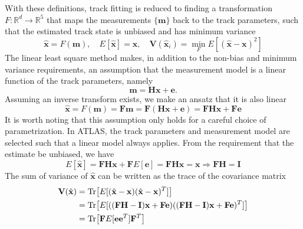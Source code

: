 With these definitions, track fitting is reduced to finding a transformation $F: \mathbb{R}^d \to \mathbb{R}^5$ that maps the measurements $\{\mathbf{m}\}$ back to the track parameters, such that the estimated track state is unbiased and has minimum variance
\begin{equation}
    \label{11.4}
    \hat{\mathbf{x}} = F(\mathbf{m}), \quad E[\hat{\mathbf{x}}] = \mathbf{x}, \quad \mathbf{V}(\hat{\mathbf{x}}_i) = \min_F E[(\hat{\mathbf{x}} - \mathbf{x}) ^2]
\end{equation}
The linear least square method makes, in addition to the non-bias and minimum variance requirements, an assumption that the measurement model is a linear function of the track parameters, namely 
\begin{equation}
    \label{11.4.1}
    \mathbf{m} = \mathbf{Hx} + \mathbf{e}.
\end{equation}
Assuming an inverse transform exists, we make an ansatz that it is also linear
\begin{equation}
    \label{11.5}
    \hat{\mathbf{x}} = F(\mathbf{m}) = \mathbf{F}\mathbf{m} = \mathbf{F}(\mathbf{Hx} + \mathbf{e}) = \mathbf{FHx} + \mathbf{Fe}
\end{equation}
It is worth noting that this assumption only holds for a careful choice of parametrization. In ATLAS, the track parameters and measurement model are selected such that a linear model always applies. From the requirement that the estimate be unbiased, we have
\begin{equation}
    \label{11.6}
    E[\hat{\mathbf{x}}] = \mathbf{FHx} + \mathbf{F}E[\mathbf{e}] = \mathbf{FHx} = \mathbf{x} \Rightarrow \mathbf{FH} = \mathbf{I}
\end{equation}
The sum of variance of $\hat{\mathbf{x}}$ can be written as the trace of the covariance matrix
\begin{equation} \label{11.7}
    \begin{split} 
        \mathbf{V}(\hat{\mathbf{x}} )  &= \Tr[ E[(\hat{\mathbf{x}} - \mathbf{x}) (\hat{\mathbf{x}} - \mathbf{x}) ^T] ] \\
        &= \Tr [ E[((\mathbf{FH-I})\mathbf{x} + \mathbf{Fe}) ((\mathbf{FH-I})\mathbf{x} + \mathbf{Fe}) ^T] ] \\
        &= \Tr [ \mathbf{F} E[\mathbf{e}\mathbf{e} ^T] \mathbf{F}^T ]
    \end{split}
\end{equation}
